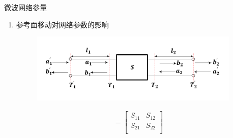 \begin{frame}{微波网络参量}
    \begin{enumerate}
        \resume
        \item 参考面移动对网络参数的影响
        \begin{figure}
            \includegraphics[width=10cm]{Cha5//fig5-18.pdf}
        \end{figure}
        \begin{gather*}
            [S]=\begin{bmatrix*}
                S_{11} & S_{12} \\
                S_{21} & S_{22} \\
            \end{bmatrix*}
        \end{gather*}
    \end{enumerate}
\end{frame}

